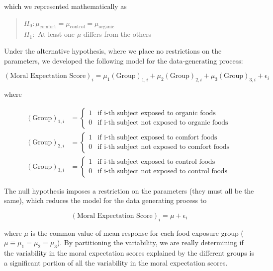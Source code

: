 \documentclass[]{book}
\theoremstyle{plain}
\theoremstyle{mydefn}
\theoremstyle{myexmpl}
\theoremstyle{remark}
\begin{document}
which we represented mathematically as

\begin{quote}
\(H_0: \mu_{\text{comfort}} = \mu_{\text{control}} = \mu_{\text{organic}}\)\\
\(H_1:\) At least one \(\mu\) differs from the others
\end{quote}

Under the alternative hypothesis, where we place no restrictions on the
parameters, we developed the following model for the data-generating
process:

\[(\text{Moral Expectation Score})_i = \mu_1 (\text{Group})_{1,i} + \mu_2 (\text{Group})_{2,i} + \mu_3 (\text{Group})_{3,i} + \epsilon_i\]

where

\[
\begin{aligned}
  (\text{Group})_{1,i} &= \begin{cases}
    1 & \text{if i-th subject exposed to organic foods} \\
    0 & \text{if i-th subject not exposed to organic foods} 
    \end{cases} \\
  (\text{Group})_{2,i} &= \begin{cases}
    1 & \text{if i-th subject exposed to comfort foods} \\
    0 & \text{if i-th subject not exposed to comfort foods} 
    \end{cases} \\
  (\text{Group})_{3,i} &= \begin{cases}
    1 & \text{if i-th subject exposed to control foods} \\
    0 & \text{if i-th subject not exposed to control foods}
    \end{cases}
\end{aligned}
\]

The null hypothesis imposes a restriction on the parameters (they must
all be the same), which reduces the model for the data generating
process to

\[(\text{Moral Expectation Score})_i = \mu + \epsilon_i\]

where \(\mu\) is the common value of mean response for each food
exposure group (\(\mu \equiv \mu_1 = \mu_2 = \mu_3\)). By partitioning
the variability, we are really determining if the variability in the
moral expectation scores explained by the different groups is a
significant portion of all the variability in the moral expectation
scores.
\end{document}
